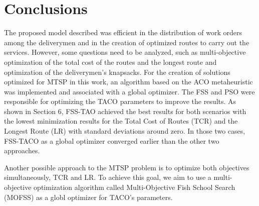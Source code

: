\documentclass[runningheads]{llncs}
\begin{document}

\section{Conclusions}
The proposed model described was efficient in the distribution of work orders among the deliverymen and in the creation of optimized routes to carry out the services. However, some questions need to be analyzed, such as multi-objective optimization of the total cost of the routes and the longest route and optimization of the deliverymen’s knapsacks.
For the creation of solutions optimized for MTSP in this work, an algorithm based on the ACO metaheuristic was implemented and associated with a global optimizer. The FSS and PSO were responsible for optimizing the TACO parameters to improve the results.
As shown in Section 6, FSS-TAO achieved the best results for both scenarios with the lowest minimization results for the Total Cost of Routes (TCR) and the Longest Route (LR) with standard deviations around zero. In those two cases, FSS-TACO as a global optimizer converged earlier than the other two approaches.

Another possible approach to the MTSP problem is to optimize both objectives simultaneously, TCR and LR. To achieve this goal, we aim to use a multi-objective optimization algorithm called Multi-Objective Fish School Search (MOFSS) as a globl optimizer for TACO's parameters.

\end{document}
